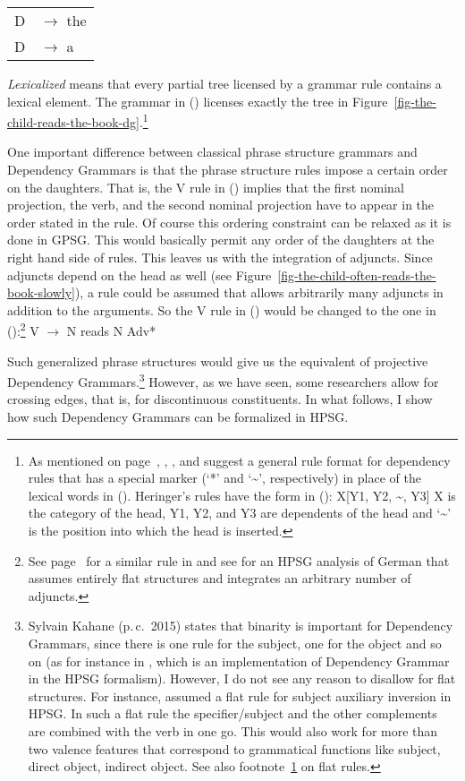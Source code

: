 \begin{tabular}[t]{@{}l@{ }l}
{D}  & {$\to$ the}\\
{D}  & {$\to$ a}\\
\end{tabular}
\z
\emph{Lexicalized}  means that every partial tree licensed by a grammar rule contains a lexical element.
The grammar in () licenses exactly the tree in
Figure~\ref{fig-the-child-reads-the-book-dg}.\footnote{\label{fn-flat-dg-rules}%
As mentioned on page~\pageref{page-rule-format-dg}, \citet[]{Gaifman65a}, \citet[]{Hays64a-u}, \citet[]{Baumgaertner70a} and \citet[]{Heringer96a-u} suggest a
general rule format for dependency rules that has a special marker (`*' and `\textasciitilde', respectively) in place of the lexical words in (). Heringer's rules have the
form in ():
\ea
X[Y1, Y2, \textasciitilde, Y3]
\z
X is the category of the head, Y1, Y2, and Y3 are dependents of the head and `\textasciitilde' is the position into
which the head is inserted.
}

One important difference between classical phrase structure grammars and Dependency Grammars is that the
phrase structure rules impose a certain order on the daughters. That is, the V rule in ()
implies that the first nominal projection, the verb, and the second nominal projection have to
appear in the order stated in the rule. Of course this ordering constraint can be relaxed as it is
done in GPSG. This would basically permit any order of the daughters at the right hand side of
rules.
This leaves us with the integration of adjuncts. Since adjuncts depend on the head as well (see
Figure~\vref{fig-the-child-often-reads-the-book-slowly}), a rule could be assumed that allows
arbitrarily many adjuncts in addition to the arguments. So the V rule in () would be changed
to the one in ():\footnote{%
  See page~\pageref{adv-metarule} for a similar rule in \gpsg and see \citet{Kasper94a} for an HPSG
analysis of German that assumes entirely flat structures and integrates an arbitrary number of adjuncts.
}
\ea
V $\to$ N reads N Adv*
\z 


Such generalized phrase structures would give us the equivalent of projective Dependency
Grammars.\footnote{\label{fn-dg-binary-branching}%
Sylvain Kahane (p.\,c.\, 2015) states that binarity is important for Dependency Grammars, since
there is one rule for the subject, one for the object and so on (as for instance in
\citealp{Kahane2009a}, which is an implementation of Dependency Grammar in the HPSG formalism). However, I do not see any reason
to disallow for flat structures. For instance, \citet[]{GSag2000a-u} assumed a flat rule for subject
auxiliary inversion in HPSG. In such a flat rule the specifier/subject and the other complements are
combined with the verb in one go. This would also work for more than two valence features that correspond
to grammatical functions like subject, direct object, indirect object. See also
footnote~\ref{fn-flat-dg-rules} on flat rules.
} However, as we have seen, some researchers allow for crossing edges, that is, for
discontinuous constituents. In what follows, I show how such Dependency Grammars can be formalized in
HPSG.

